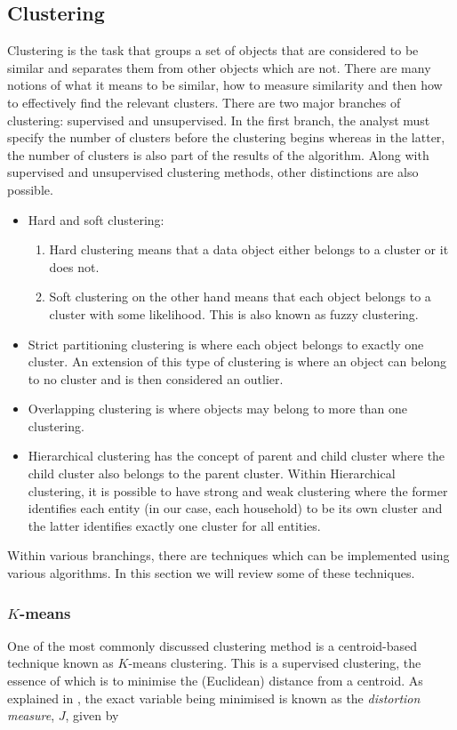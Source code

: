 \documentclass[a4paper]{article}
\begin{document}
\subsection{Clustering} \label{subsec:clustering}
Clustering is the task that groups a set of objects that are considered to be similar and separates them from other objects which are not. There are many notions of what it means to be similar, how to measure similarity and then how to effectively find the relevant clusters. There are two major branches of clustering: supervised and unsupervised. In the first branch, the analyst must specify the number of clusters before the clustering begins whereas in the latter, the number of clusters is also part of the results of the algorithm. Along with supervised and unsupervised clustering methods, other distinctions are also possible.
\begin{itemize}
\item Hard and soft clustering: \begin{enumerate} \item Hard clustering means that a data object either belongs to a cluster or it does not. \item Soft clustering on the other hand means that each object belongs to a cluster with some likelihood. This is also known as fuzzy clustering. \end{enumerate}
\item Strict partitioning clustering is where each object belongs to exactly one cluster. An extension of this type of clustering is where an object can belong to no cluster and is then considered an outlier.
\item Overlapping clustering is where objects may belong to more than one clustering.
\item Hierarchical clustering has the concept of parent and child cluster where the child cluster also belongs to the parent cluster. Within Hierarchical clustering, it is possible to have strong and weak clustering where the former identifies each entity (in our case, each household) to be its own cluster and the latter identifies exactly one cluster for all entities.
\end{itemize}

Within various branchings, there are techniques which can be implemented using various algorithms. In this section we will review some of these techniques.

\subsubsection{$K$-means}\label{subsubsec:kmeans}
One of the most commonly discussed clustering method is a centroid-based technique known as $K$-means clustering. This is a supervised clustering, the essence of which is to minimise the (Euclidean) distance from a centroid. As explained in \cite{bishop}, the exact variable being minimised is known as the \textit{distortion measure}, $J$, given by
\end{document}
